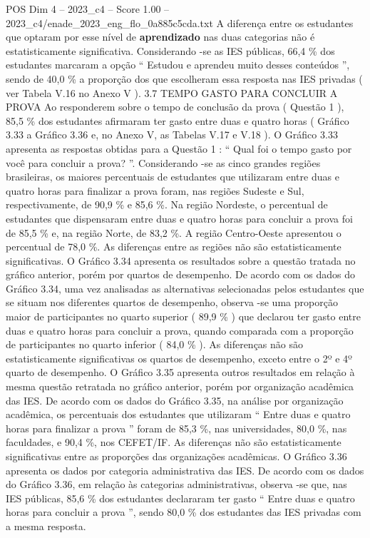 \begin{textsample}{POS Dim 4 – 2023\_c4 – Score 1.00 – 2023\_c4/enade\_2023\_eng\_flo\_0a885c5cda.txt}
A diferença entre os estudantes que optaram por esse nível de \textbf{aprendizado} nas duas categorias não é estatisticamente significativa.
Considerando -se as IES públicas, 66,4 \% dos estudantes marcaram a opção “ Estudou e aprendeu muito desses conteúdos ”, sendo de 40,0 \% a proporção dos que escolheram essa resposta nas IES privadas ( ver Tabela V.16 no Anexo V ). 3.7 TEMPO GASTO PARA CONCLUIR A PROVA Ao responderem sobre o tempo de conclusão da prova ( Questão 1 ), 85,5 \% dos estudantes afirmaram ter gasto entre duas e quatro horas ( Gráfico 3.33 a Gráfico 3.36 e, no Anexo V, as Tabelas V.17 e V.18 ).
O Gráfico 3.33 apresenta as respostas obtidas para a Questão 1 : “ Qual foi o tempo gasto por você para concluir a prova? ”.
Considerando -se as cinco grandes regiões brasileiras, os maiores percentuais de estudantes que utilizaram entre duas e quatro horas para finalizar a prova foram, nas regiões Sudeste e Sul, respectivamente, de 90,9 \% e 85,6 \%.
Na região Nordeste, o percentual de estudantes que dispensaram entre duas e quatro horas para concluir a prova foi de 85,5 \% e, na região Norte, de 83,2 \%.
A região Centro-Oeste apresentou o percentual de 78,0 \%.
As diferenças entre as regiões não são estatisticamente significativas.
O Gráfico 3.34 apresenta os resultados sobre a questão tratada no gráfico anterior, porém por quartos de desempenho.
De acordo com os dados do Gráfico 3.34, uma vez analisadas as alternativas selecionadas pelos estudantes que se situam nos diferentes quartos de desempenho, observa -se uma proporção maior de participantes no quarto superior ( 89,9 \% ) que declarou ter gasto entre duas e quatro horas para concluir a prova, quando comparada com a proporção de participantes no quarto inferior ( 84,0 \% ).
As diferenças não são estatisticamente significativas os quartos de desempenho, exceto entre o 2º e 4º quarto de desempenho.
O Gráfico 3.35 apresenta outros resultados em relação à mesma questão retratada no gráfico anterior, porém por organização acadêmica das IES.
De acordo com os dados do Gráfico 3.35, na análise por organização acadêmica, os percentuais dos estudantes que utilizaram “ Entre duas e quatro horas para finalizar a prova ” foram de 85,3 \%, nas universidades, 80,0 \%, nas faculdades, e 90,4 \%, nos CEFET/IF.
As diferenças não são estatisticamente significativas entre as proporções das organizações acadêmicas.
O Gráfico 3.36 apresenta os dados por categoria administrativa das IES.
De acordo com os dados do Gráfico 3.36, em relação às categorias administrativas, observa -se que, nas IES públicas, 85,6 \% dos estudantes declararam ter gasto “ Entre duas e quatro horas para concluir a prova ”, sendo 80,0 \% dos estudantes das IES privadas com a mesma resposta.

\end{textsample}
